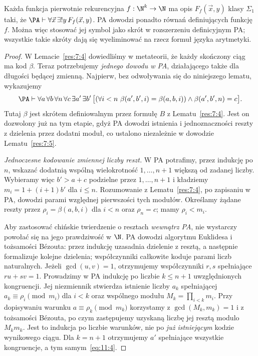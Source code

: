 \begin{lemat}\label{res:11:3}
Każda funkcja pierwotnie rekurencyjna $f:\N^k\to\N$ ma opis $F_f(\vec x,y)$ klasy $\Sigma_1$ taki, że
$\PA\vdash\forall\vec x\,\exists!y\,F_f(\vec x,y)$.
PA dowodzi ponadto równań definiujących funkcję $f$. Można więc stosować jej symbol jako skrót w rozszerzeniu definicyjnym PA; wszystkie takie skróty dają się wyeliminować na rzecz formuł języka arytmetyki.
\end{lemat}
\begin{proof}
W Lemacie~\ref{res:7:4} dowiedliśmy w metateorii, że każdy skończony ciąg ma kod $\beta$. Teraz potrzebujemy \emph{jednego dowodu w PA}, działającego także dla długości będącej zmienną. Najpierw, bez odwoływania się do niniejszego lematu, wykazujemy
\begin{equation}\label{eq:11:4}
\PA\vdash\forall a\,\forall b\,\forall n\,\forall c\,\exists a'\,\exists b'\,
\bigl[(\forall i<n\ \beta(a',b',i)=\beta(a,b,i))
\land\beta(a',b',n)=c\bigr].
\end{equation}
Tutaj $\beta$ jest skrótem definiowalnym przez formułę $B$ z Lematu~\ref{res:7:4}. Jest on dozwolony już na tym etapie, gdyż PA dowodzi istnienia i jednoznaczności reszty z dzielenia przez dodatni moduł, co ustalono niezależnie w dowodzie Lematu~\ref{res:7:5}.

\emph{Jednoczesne kodowanie zmiennej liczby reszt.} W PA potrafimy, przez indukcję po $n$, wskazać dodatnią wspólną wielokrotność $1,\ldots,n+1$ większą od zadanej liczby. Wybieramy więc $b'>a+c$ podzielne przez $1,\ldots,n+1$ i kładziemy $m_i=1+(i+1)b'$ dla $i\le n$. Rozumowanie z Lematu~\ref{res:7:4}, po zapisaniu w PA, dowodzi parami względnej pierwszości tych modułów. Określamy żądane reszty przez $\rho_i=\beta(a,b,i)$ dla $i<n$ oraz $\rho_n=c$; mamy $\rho_i<m_i$.

Aby zastosować chińskie twierdzenie o resztach \emph{wewnątrz PA}, nie wystarczy powołać się na jego prawdziwość w $\N$. PA dowodzi algorytmu Euklidesa i tożsamości Bézouta: przez indukcję uzasadnia dzielenie z resztą, a następnie formalizuje kolejne dzielenia; współczynniki całkowite koduje parami liczb naturalnych. Jeżeli $\gcd(u,v)=1$, otrzymujemy współczynniki $r,s$ spełniające $ru+sv=1$. Prowadzimy w PA indukcję po liczbie $k\le n+1$ uwzględnionych kongruencji. Jej niezmiennik stwierdza istnienie liczby $a_k$ spełniającej $a_k\equiv\rho_i\pmod{m_i}$ dla $i<k$ oraz wspólnego modułu $M_k=\prod_{i<k}m_i$. Przy dopisywaniu warunku $a\equiv\rho_k\pmod{m_k}$ korzystamy z $\gcd(M_k,m_k)=1$ i z tożsamości Bézouta, po czym zastępujemy uzyskaną liczbę jej resztą modulo $M_km_k$. Jest to indukcja po liczbie warunków, nie po \emph{już istniejącym} kodzie wynikowego ciągu. Dla $k=n+1$ otrzymujemy $a'$ spełniające wszystkie kongruencje, a tym samym~\eqref{eq:11:4}.


\end{proof}
